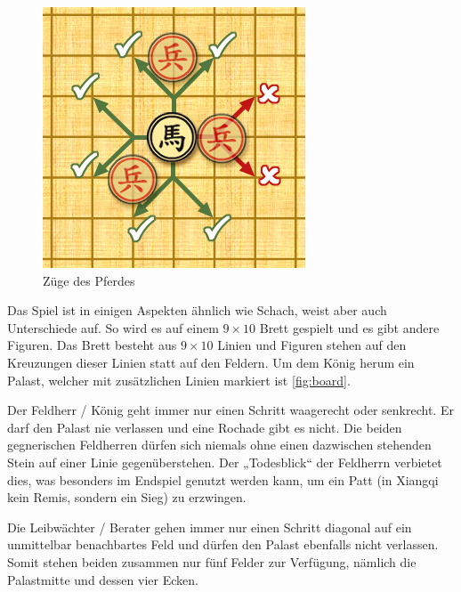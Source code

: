 \documentclass{jpp}
\begin{document}
\begin{figure}
\begin{minipage}{0.49\textwidth}
    \includegraphics[width=\textwidth]{imgs/MovementOfHorsePiece.png}
    \caption{Züge des Pferdes}
    \label{fig:Horse}
  \end{minipage}
\end{figure}
Das Spiel ist in einigen Aspekten ähnlich wie Schach, weist aber auch Unterschiede auf. So wird es auf einem $9 \times 10$ Brett gespielt und es gibt andere Figuren.
Das Brett besteht aus $9 \times 10$ Linien und Figuren stehen auf den Kreuzungen dieser Linien statt auf den Feldern. Um dem König herum ein Palast, welcher mit zusätzlichen Linien markiert ist \ref{fig:board}.


Der Feldherr / König geht immer nur einen Schritt waagerecht oder senkrecht. Er darf den Palast nie verlassen und eine Rochade gibt es nicht. Die beiden gegnerischen Feldherren dürfen sich niemals ohne einen dazwischen stehenden Stein auf einer Linie gegenüberstehen. Der „Todesblick“ der Feldherrn verbietet dies, was besonders im Endspiel genutzt werden kann, um ein Patt (in Xiangqi kein Remis, sondern ein Sieg) zu erzwingen.

Die Leibwächter / Berater gehen immer nur einen Schritt diagonal auf ein unmittelbar benachbartes Feld und dürfen den Palast ebenfalls nicht verlassen. Somit stehen beiden zusammen nur fünf Felder zur Verfügung, nämlich die Palastmitte und dessen vier Ecken.
\end{document}
